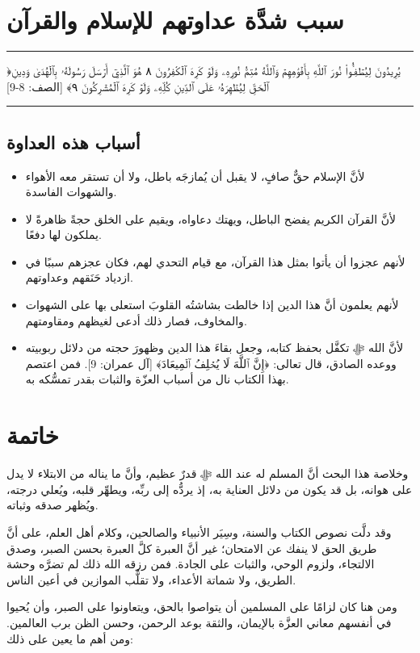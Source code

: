 \documentclass[12pt,openany]{book}
\newenvironment{quranblock}
  {\par\medskip\begin{center}\begin{minipage}{0.92\linewidth}\centering\quranfont\large\color{ink}\hrule\vspace{0.65em}}
  {\vspace{0.65em}\hrule\end{minipage}\end{center}\medskip}
\newenvironment{bullets}
  {\begin{itemize}}
  {\end{itemize}}
\begin{document}
\chapter{سبب شدَّة عداوتهم للإسلام والقرآن}
\begin{quranblock}
﴿يُرِيدُونَ لِيُطۡفِـُٔواْ نُورَ ٱللَّهِ بِأَفۡوَٰهِهِمۡ وَٱللَّهُ مُتِمُّ نُورِهِۦ وَلَوۡ كَرِهَ ٱلۡكَٰفِرُونَ ٨ هُوَ ٱلَّذِيٓ أَرۡسَلَ رَسُولَهُۥ بِٱلۡهُدَىٰ وَدِينِ ٱلۡحَقِّ لِيُظۡهِرَهُۥ عَلَى ٱلدِّينِ كُلِّهِۦ وَلَوۡ كَرِهَ ٱلۡمُشۡرِكُونَ ٩﴾ [الصف: 8-9]
\end{quranblock}

\section{أسباب هذه العداوة}
\begin{bullets}
\item لأنَّ الإسلام حقٌّ صافٍ، لا يقبل أن يُمازجَه باطل، ولا أن تستقر معه الأهواء والشهوات الفاسدة.
\item لأنَّ القرآن الكريم يفضح الباطل، ويهتك دعاواه، ويقيم على الخلق حجةً ظاهرةً لا يملكون لها دفعًا.
\item لأنهم عجزوا أن يأتوا بمثل هذا القرآن، مع قيام التحدي لهم، فكان عجزهم سببًا في ازدياد حَنَقهم وعداوتهم.
\item لأنهم يعلمون أنَّ هذا الدين إذا خالطت بشاشتُه القلوبَ استعلى بها على الشهوات والمخاوف، فصار ذلك أدعى لغيظهم ومقاومتهم.
\item لأنَّ الله ﷻ تكفَّل بحفظ كتابه، وجعل بقاءَ هذا الدين وظهورَ حجته من دلائل ربوبيته ووعده الصادق، قال تعالى: ﴿إِنَّ ٱللَّهَ لَا يُخۡلِفُ ٱلۡمِيعَادَ﴾ [آل عمران: 9]. فمن اعتصم بهذا الكتاب نال من أسباب العزّة والثبات بقدر تمسُّكه به.
\end{bullets}
\chapter{خاتمة}
وخلاصة هذا البحث أنَّ المسلم له عند الله ﷻ قدرٌ عظيم، وأنَّ ما يناله من الابتلاء لا يدل على هوانه، بل قد يكون من دلائل العناية به، إذ يردُّه إلى ربِّه، ويطهِّر قلبه، ويُعلي درجته، ويُظهر صدقه وثباته.

وقد دلَّت نصوص الكتاب والسنة، وسِيَر الأنبياء والصالحين، وكلام أهل العلم، على أنَّ طريق الحق لا ينفك عن الامتحان؛ غير أنَّ العبرة كلَّ العبرة بحسن الصبر، وصدق الالتجاء، ولزوم الوحي، والثبات على الجادة. فمن رزقه الله ذلك لم تضرَّه وحشة الطريق، ولا شماتة الأعداء، ولا تقلُّب الموازين في أعين الناس.

ومن هنا كان لزامًا على المسلمين أن يتواصوا بالحق، ويتعاونوا على الصبر، وأن يُحيوا في أنفسهم معاني العزَّة بالإيمان، والثقة بوعد الرحمن، وحسن الظن برب العالمين. ومن أهم ما يعين على ذلك:
\end{document}
